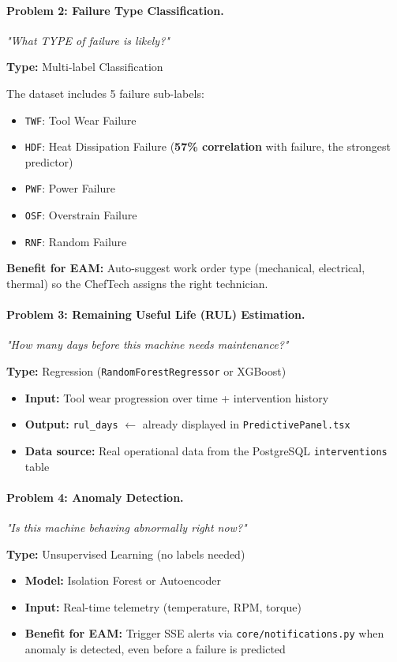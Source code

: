 \paragraph{Problem 2: Failure Type Classification.}
\emph{"What TYPE of failure is likely?"}

\textbf{Type:} Multi-label Classification

The dataset includes 5 failure sub-labels:
\begin{itemize}
\item \texttt{TWF}: Tool Wear Failure
\item \texttt{HDF}: Heat Dissipation Failure (\textbf{57\% correlation} with failure, the strongest predictor)
\item \texttt{PWF}: Power Failure
\item \texttt{OSF}: Overstrain Failure
\item \texttt{RNF}: Random Failure
\end{itemize}

\textbf{Benefit for EAM:} Auto-suggest work order type (mechanical, electrical, thermal) so the ChefTech assigns the right technician.

\paragraph{Problem 3: Remaining Useful Life (RUL) Estimation.}
\emph{"How many days before this machine needs maintenance?"}

\textbf{Type:} Regression (\texttt{RandomForestRegressor} or XGBoost)

\begin{itemize}
\item \textbf{Input:} Tool wear progression over time + intervention history
\item \textbf{Output:} \texttt{rul\_days} $\leftarrow$ already displayed in \texttt{PredictivePanel.tsx}
\item \textbf{Data source:} Real operational data from the PostgreSQL \texttt{interventions} table
\end{itemize}

\paragraph{Problem 4: Anomaly Detection.}
\emph{"Is this machine behaving abnormally right now?"}

\textbf{Type:} Unsupervised Learning (no labels needed)

\begin{itemize}
\item \textbf{Model:} Isolation Forest or Autoencoder
\item \textbf{Input:} Real-time telemetry (temperature, RPM, torque)
\item \textbf{Benefit for EAM:} Trigger SSE alerts via \texttt{core/notifications.py} when anomaly is detected, even before a failure is predicted
\end{itemize}

